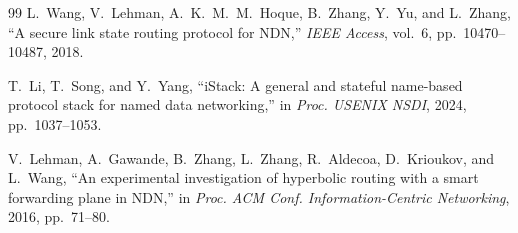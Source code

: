 \documentclass[journal]{IEEEtran}
\begin{document}
\begin{thebibliography}{99}
L.~Wang, V.~Lehman, A.~K.~M.~M.~Hoque, B.~Zhang, Y.~Yu, and L.~Zhang,
``A secure link state routing protocol for NDN,''
\emph{IEEE Access}, vol.~6, pp.~10470--10487, 2018.

T.~Li, T.~Song, and Y.~Yang,
``iStack: A general and stateful name-based protocol stack for named data networking,''
in \emph{Proc. USENIX NSDI}, 2024, pp.~1037--1053.

V.~Lehman, A.~Gawande, B.~Zhang, L.~Zhang, R.~Aldecoa, D.~Krioukov, and L.~Wang,
``An experimental investigation of hyperbolic routing with a smart forwarding plane in NDN,''
in \emph{Proc. ACM Conf. Information-Centric Networking}, 2016, pp.~71--80.

\end{thebibliography}
\end{document}
